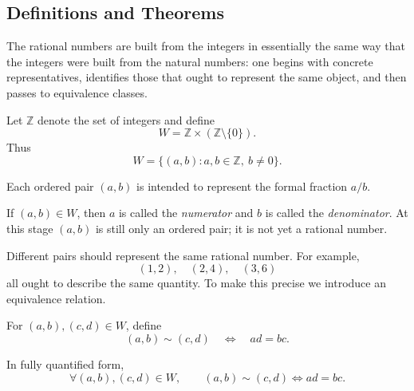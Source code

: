 
\label{sec:constructing-rational-numbers-as-equivalence-classes}

\subsection*{Definitions and Theorems}

\begin{exposition}
The rational numbers are built from the integers in essentially the same way that the integers were
built from the natural numbers: one begins with concrete representatives, identifies those that ought
to represent the same object, and then passes to equivalence classes.
\end{exposition}

\begin{definition}
\label{def:fraction-pairs}

Let $\mathbb{Z}$ denote the set of integers and define
\[
W = \mathbb{Z} \times (\mathbb{Z}\setminus\{0\}).
\]
Thus
\[
W = \{(a,b) : a,b\in\mathbb{Z},\ b\neq 0\}.
\]

Each ordered pair $(a,b)$ is intended to represent the formal fraction $a/b$.

\end{definition}

\begin{remark*}
\label{rem:numerator-denominator}

If $(a,b)\in W$, then $a$ is called the \emph{numerator} and $b$ is called the
\emph{denominator}.  At this stage $(a,b)$ is still only an ordered pair; it is not yet a rational
number.

\end{remark*}

\begin{remark*}
Different pairs should represent the same rational number.  For example,
\[
(1,2),\quad (2,4),\quad (3,6)
\]
all ought to describe the same quantity.  To make this precise we introduce an equivalence relation.
\end{remark*}

\begin{definition}
\label{def:fraction-pair-equality}

For $(a,b),(c,d)\in W$, define
\[
(a,b) \sim (c,d)
\quad\Longleftrightarrow\quad
ad = bc.
\]

In fully quantified form,
\[
\forall (a,b),(c,d)\in W,
\qquad
(a,b)\sim(c,d)
\Longleftrightarrow
ad=bc.
\]

\end{definition}

